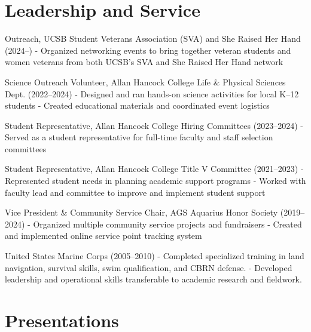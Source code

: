 \documentclass[letterpaper]{article}
\newenvironment{biblist}{%
   \begin{list}{}{%
     \setlength{\labelwidth}{0pt}%
     \setlength{\labelsep}{1em}%
     \setlength{\leftmargin}{2em}%
     \setlength{\itemindent}{-1em}%
   }
}{\end{list}}
\begin{document}
\section*{Leadership and Service}

\begin{biblist}
\item Outreach, UCSB Student Veterans Association (SVA) and She Raised Her Hand (2024–)
- Organized networking events to bring together veteran students and women veterans from both UCSB’s SVA and She Raised Her Hand network

\item Science Outreach Volunteer, Allan Hancock College Life \& Physical Sciences Dept. (2022–2024)
- Designed and ran hands-on science activities for local K–12 students  
- Created educational materials and coordinated event logistics

\item Student Representative, Allan Hancock College Hiring Committees (2023–2024)
- Served as a student representative for full-time faculty and staff selection committees

\item Student Representative, Allan Hancock College Title V Committee (2021–2023)
- Represented student needs in planning academic support programs  
- Worked with faculty lead and committee to improve and implement student support

\item Vice President \& Community Service Chair, AGS Aquarius Honor Society (2019–2024)  
- Organized multiple community service projects and fundraisers  
- Created and implemented online service point tracking system

\item United States Marine Corps (2005–2010)  
- Completed specialized training in land navigation, survival skills, swim qualification, and CBRN defense.  
- Developed leadership and operational skills transferable to academic research and fieldwork.
\end{biblist}


\section*{Presentations}
\end{document}
